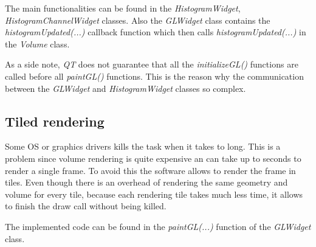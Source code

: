 \documentclass{article}
\begin{document}
The main functionalities can be found in the \textit{HistogramWidget}, \textit{HistogramChannelWidget} classes. Also the \textit{GLWidget} class contains the \textit{histogramUpdated(...)} callback function which then calls \textit{histogramUpdated(...)} in the \textit{Volume} class.

As a side note, \textit{QT} does not guarantee that all the \textit{initializeGL()} functions are called before all \textit{paintGL()} functions. This is the reason why the communication between the \textit{GLWidget} and \textit{HistogramWidget} classes so complex. 
 
\subsection*{Tiled rendering}
Some OS or graphics drivers kills the task when it takes to long. This is a problem since volume rendering is quite expensive an can take up to seconds to render a single frame. To avoid this the software allows to render the frame in tiles. Even though there is an overhead of rendering the same geometry and volume for every tile, because each rendering tile takes much less time, it allows to finish the draw call without being killed.

The implemented code can be found in the \textit{paintGL(...)} function of the \textit{GLWidget} class. 
\end{document}
